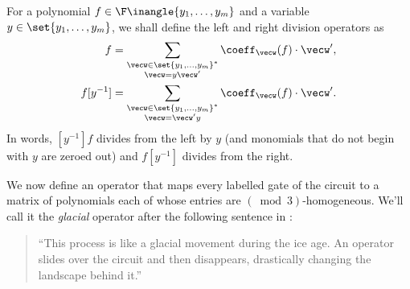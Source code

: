 \begin{definition}
  For a polynomial $f \in \F\inangle{y_1,\ldots, y_m}$ and a variable $y \in \set{y_1,\ldots, y_m}$, we shall define the left and right division operators as
  \begin{align*}
    [y^{-1}] f & = \sum_{\substack{\vecw\in \set{y_1,\ldots, y_m}^*\\ \vecw = y \vecw'}} \coeff_\vecw(f) \cdot \vecw',\\
     f [y^{-1}] & = \sum_{\substack{\vecw\in \set{y_1,\ldots, y_m}^*\\ \vecw = \vecw' y}} \coeff_\vecw(f) \cdot \vecw'.
  \end{align*}
  In words, $[y^{-1}] f$ divides from the left by $y$ (and monomials that do not begin with $y$ are zeroed out) and $f [y^{-1}]$ divides from the right.
\end{definition}

We now define an operator that maps every labelled gate of the circuit to a matrix of polynomials each of whose entries are $(\bmod{3})$-homogeneous. We'll call it the \emph{glacial} operator after the following sentence in \cite{CILM18}:
\begin{quote}
  ``This process is like a glacial movement during the ice age. An operator slides over the circuit and then disappears, drastically changing the landscape behind it.''
\end{quote}

